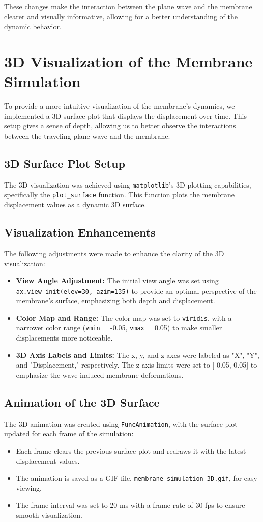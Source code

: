 \documentclass{article}
\begin{document}
These changes make the interaction between the plane wave and the membrane clearer and visually informative, allowing for a better understanding of the dynamic behavior.


\section{3D Visualization of the Membrane Simulation}

To provide a more intuitive visualization of the membrane's dynamics, we implemented a 3D surface plot that displays the displacement over time. This setup gives a sense of depth, allowing us to better observe the interactions between the traveling plane wave and the membrane.

\subsection{3D Surface Plot Setup}
The 3D visualization was achieved using \texttt{matplotlib}'s 3D plotting capabilities, specifically the \texttt{plot\_surface} function. This function plots the membrane displacement values as a dynamic 3D surface.

\subsection{Visualization Enhancements}
The following adjustments were made to enhance the clarity of the 3D visualization:
\begin{itemize}
    \item \textbf{View Angle Adjustment:} The initial view angle was set using \texttt{ax.view\_init(elev=30, azim=135)} to provide an optimal perspective of the membrane’s surface, emphasizing both depth and displacement.
    \item \textbf{Color Map and Range:} The color map was set to \texttt{viridis}, with a narrower color range (\texttt{vmin} = -0.05, \texttt{vmax} = 0.05) to make smaller displacements more noticeable.
    \item \textbf{3D Axis Labels and Limits:} The x, y, and z axes were labeled as "X", "Y", and "Displacement," respectively. The z-axis limits were set to [-0.05, 0.05] to emphasize the wave-induced membrane deformations.
\end{itemize}

\subsection{Animation of the 3D Surface}
The 3D animation was created using \texttt{FuncAnimation}, with the surface plot updated for each frame of the simulation:
\begin{itemize}
    \item Each frame clears the previous surface plot and redraws it with the latest displacement values.
    \item The animation is saved as a GIF file, \texttt{membrane\_simulation\_3D.gif}, for easy viewing.
    \item The frame interval was set to 20 ms with a frame rate of 30 fps to ensure smooth visualization.
\end{itemize}
\end{document}
